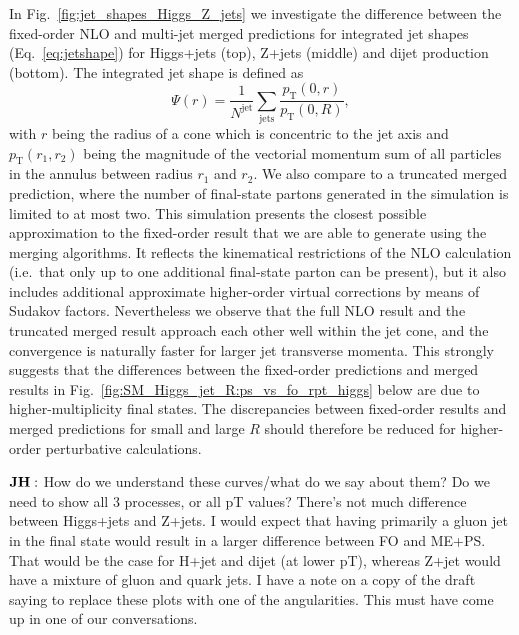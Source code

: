 \documentclass[aps,prd,onecolumn,fleqn,superscriptaddress,groupedaddress,nofootinbib,preprintnumbers,nobalancelastpage]{revtex4}
\begin{document}
In Fig.~\ref{fig:jet_shapes_Higgs_Z_jets} we investigate the difference between the fixed-order NLO
and multi-jet merged predictions for integrated jet shapes (Eq.~\ref{eq:jetshape}) for
Higgs+jets (top), Z+jets (middle) and dijet production (bottom). 
The integrated jet shape is defined as
\begin{equation}
\Psi(r) = \frac{1}{N^\mathrm{jet}}\sum\limits_{\mathrm{jets}} \frac{p_\mathrm{T}(0,r)}{p_\mathrm{T}(0,R)}, 
\label{eq:jetshape}
\end{equation}
with $r$ being the radius of a cone which is concentric to the jet axis and $p_\mathrm{T}(r_1,r_2)$ being the magnitude of the vectorial momentum sum of all
particles in the annulus between radius $r_1$ and $r_2$. 
We also compare
to a truncated merged prediction, where the number of final-state partons generated
in the simulation is limited to at most two. This simulation presents the closest
possible approximation to the fixed-order result that we are able to generate using the
merging algorithms. It reflects the kinematical restrictions of the NLO calculation
(i.e.\ that only up to one additional final-state parton can be present), but it also
includes additional approximate higher-order virtual corrections by means of Sudakov
factors. Nevertheless we observe that the full NLO result and the truncated merged
result approach each other well within the jet cone, and the convergence is naturally
faster for larger jet transverse momenta. This strongly suggests that the differences
between the fixed-order predictions and merged results in
Fig.~\ref{fig:SM_Higgs_jet_R:ps_vs_fo_rpt_higgs} below are due to higher-multiplicity final
states. The discrepancies between fixed-order results and merged predictions for
small and large $R$ should therefore be reduced for higher-order perturbative
calculations. 

$\bf JH:$ How do we understand these curves/what do we say about them? Do we need to show all 3 processes, or all pT values? There's not much difference between Higgs+jets and Z+jets. I would expect that having primarily a gluon jet in the final state would result in a larger difference between FO and ME+PS. That would be the case for H+jet and dijet (at lower pT), whereas Z+jet would have a mixture of gluon and quark jets. I have a note on a copy of the draft saying to replace these plots with one of the angularities. This must have come up in one of our conversations. 
\end{document}

